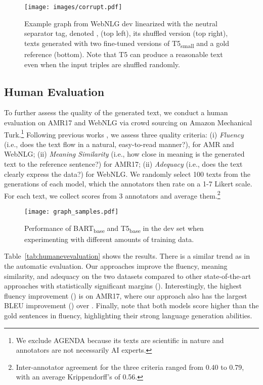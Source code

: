 \documentclass[11pt,a4paper]{article}
\newcommand{\sep}{}
\begin{document}
\begin{table*}[t]
 \begin{figure*}[t]
    \centering
    \texttt{[image: images/corrupt.pdf]}
    \caption{Example graph from WebNLG dev linearized with the neutral separator tag, denoted \sep{}, (top left), its shuffled version (top right), texts generated with two fine-tuned versions of T5\textsubscript{small} and a gold reference (bottom). Note that T5 can produce a reasonable text even when the input triples are shuffled randomly.}
    \label{fig:graphs-shuffle}
\end{figure*}

\subsection{Human Evaluation}
\label{sec:human_eval}
To further assess the quality of the generated text, we conduct a human evaluation on AMR17 and WebNLG via crowd sourcing on Amazon Mechanical Turk.\footnote{We exclude AGENDA because its texts are scientific in nature and annotators are not necessarily AI experts.} Following previous works \cite{gardent-etal-2017-webnlg, castro-ferreira-etal-2019-neural}, we assess three quality criteria: (i) \emph{Fluency} (i.e., does the text flow in a natural, easy-to-read manner?), for AMR and WebNLG; (ii) \emph{Meaning Similarity} (i.e., how close in meaning is
the generated text to the reference sentence?) for AMR17; (ii) \emph{Adequacy} (i.e., does the text clearly express the data?) for WebNLG. We randomly select 100 texts from the generations of each model, which the annotators then rate on a 1-7 Likert scale. For each text, we collect scores from 3 annotators and average them.\footnote{Inter-annotator agreement for the three criteria ranged from 0.40 to 0.79, with an average Krippendorff's  of 0.56.} 




 \begin{figure}[t]
    \centering
    \texttt{[image: graph\_samples.pdf]}
    \caption{Performance of BART\textsubscript{base} and T5\textsubscript{base} in the dev set when experimenting with different amounts of training data.}
    \label{fig:graphs-trainingexamples}
\end{figure}

Table~\ref{tab:humanevevaluation} shows the results. There is a similar trend as in the automatic evaluation. Our approaches improve the fluency, meaning similarity, and adequacy on the two datasets compared to other state-of-the-art approaches with statistically significant margins (). Interestingly, the highest fluency improvement () is on AMR17, where our approach also has the largest BLEU improvement () over \citet{harkous2020text}. Finally, note that both models score higher than the gold sentences in fluency, highlighting their strong language generation abilities.









\end{table*}
\end{document}

